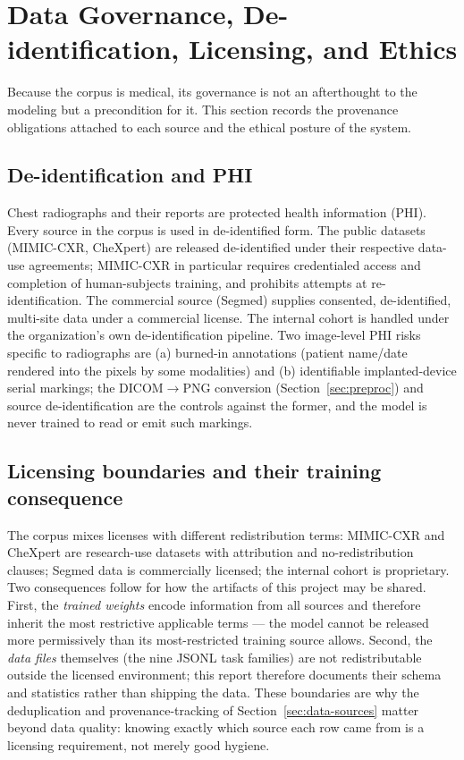 \documentclass[11pt,a4paper]{article}
\begin{document}
\section{Data Governance, De-identification, Licensing, and Ethics}
\label{sec:governance}

Because the corpus is medical, its governance is not an afterthought to the modeling but a precondition for it. This section records the provenance obligations attached to each source and the ethical posture of the system.

\subsection{De-identification and PHI}
Chest radiographs and their reports are protected health information (PHI). Every source in the corpus is used in de-identified form. The public datasets (MIMIC-CXR, CheXpert) are released de-identified under their respective data-use agreements; MIMIC-CXR in particular requires credentialed access and completion of human-subjects training, and prohibits attempts at re-identification. The commercial source (Segmed) supplies consented, de-identified, multi-site data under a commercial license. The internal cohort is handled under the organization's own de-identification pipeline. Two image-level PHI risks specific to radiographs are (a) burned-in annotations (patient name/date rendered into the pixels by some modalities) and (b) identifiable implanted-device serial markings; the DICOM$\rightarrow$PNG conversion (Section~\ref{sec:preproc}) and source de-identification are the controls against the former, and the model is never trained to read or emit such markings.

\subsection{Licensing boundaries and their training consequence}
The corpus mixes licenses with different redistribution terms: MIMIC-CXR and CheXpert are research-use datasets with attribution and no-redistribution clauses; Segmed data is commercially licensed; the internal cohort is proprietary. Two consequences follow for how the artifacts of this project may be shared. First, the \emph{trained weights} encode information from all sources and therefore inherit the most restrictive applicable terms --- the model cannot be released more permissively than its most-restricted training source allows. Second, the \emph{data files} themselves (the nine JSONL task families) are not redistributable outside the licensed environment; this report therefore documents their schema and statistics rather than shipping the data. These boundaries are why the deduplication and provenance-tracking of Section~\ref{sec:data-sources} matter beyond data quality: knowing exactly which source each row came from is a licensing requirement, not merely good hygiene.
\end{document}
